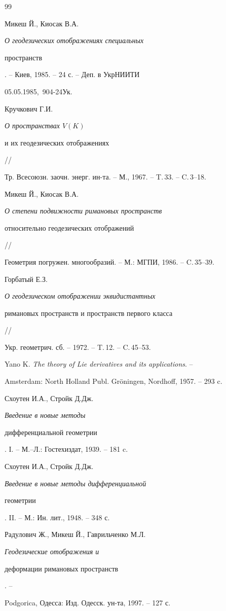 \begin{thebibliography}{99}


Микеш Й., Киосак В.А. {\em О геодезических отображениях специальных


пространств}. -- Киев, 1985. -- 24 с. -- Деп. в УкрНИИТИ


05.05.1985, \No\,904-24Ук.







Кручкович Г.И. {\em О пространствах $V(K)$


и их геодезических отображениях} //


Тр. Всесоюзн. заочн. энерг. ин-та.  -- М., 1967. -- T.\,33. -- C.\,3--18.







Микеш Й., Киосак В.А. {\em О степени подвижности римановых пространств


относительно геодезических отображений} //


Геометрия погружен. многообразий. -- М.: МГПИ, 1986. -- C.\,35--39.







Горбатый Е.З. {\em О геодезическом отображении эквидистантных


римановых пространств и пространств первого класса} //


Укр. геометрич. сб. -- 1972. -- T.\,12. -- C.\,45--53.







Yano K. {\em The theory of Lie derivatives and its applications}. --


Amsterdam: North Holland Publ. Gr\"oningen, Nordhoff, 1957. -- 293 c.







Схоутен И.А., Стройк Д.Дж. {\em Введение в новые методы


дифференциальной геометрии}. I. -- М.--Л.: Гостехиздат, 1939. -- 181 c.







Схоутен И.А., Стройк Д.Дж. {\em Введение в новые методы дифференциальной


геометрии}. II. -- М.: Ин. лит., 1948. -- 348 с.







Радулович Ж., Микеш Й., Гаврильченко М.Л. {\em Геодезические отображения и


деформации римановых пространств}. --


Podgorica, Одесса: Изд. Одесск. ун-та, 1997. -- 127 с.





\end{thebibliography}
